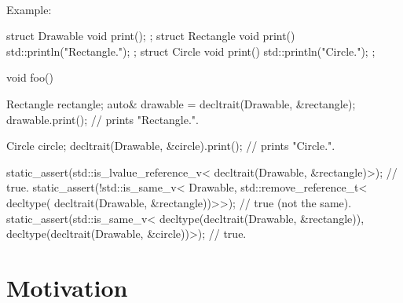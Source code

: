 \documentclass{article}
\begin{document}
\paragraph{} Example:
\begin{codeblock}
struct Drawable { void print(); };
struct Rectangle { void print() { std::println("Rectangle."); } };
struct Circle { void print() { std::println("Circle."); } };

void foo() {
  Rectangle rectangle;
  auto& drawable = decltrait(Drawable, &rectangle);
  drawable.print(); // prints "Rectangle.".

  Circle circle;
  decltrait(Drawable, &circle).print(); // prints "Circle.".

  static_assert(std::is_lvalue_reference_v<
    decltrait(Drawable, &rectangle)>); // true.
  static_assert(!std::is_same_v<
    Drawable,
    std::remove_reference_t<
      decltype(
        decltrait(Drawable, &rectangle))>>); // true (not the same).
  static_assert(std::is_same_v<
    decltype(decltrait(Drawable, &rectangle)),
    decltype(decltrait(Drawable, &circle))>); // true.
}
\end{codeblock}



\section{Motivation}
\end{document}
